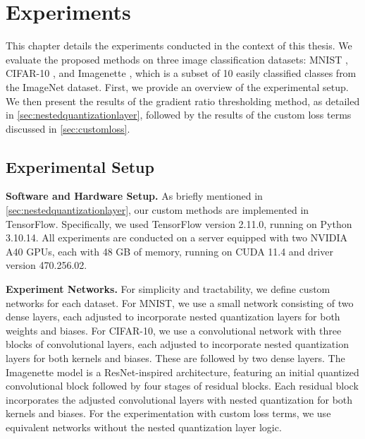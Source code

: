 \chapter{Experiments\label{cha:chapter4}}
\hspace*{1em}This chapter details the experiments conducted in the context of this thesis.
We evaluate the proposed methods on three image classification datasets:
MNIST \cite{lecun2010mnist},
CIFAR-10 \cite{krizhevsky2009learning},
and Imagenette \cite{DBLP:journals/information/HowardG20}, which is a subset of 10 easily classified classes from the ImageNet dataset.
First, we provide an overview of the experimental setup.
We then present the results of the gradient ratio thresholding method, as detailed in \cref{sec:nestedquantizationlayer},
followed by the results of the custom loss terms discussed in \cref{sec:customloss}.


\section{Experimental Setup}
\label{sec:setup}
\hspace*{1em}\textbf{Software and Hardware Setup.} As briefly mentioned in \cref{sec:nestedquantizationlayer},
our custom methods are implemented in TensorFlow.
Specifically, we used TensorFlow version 2.11.0, running on Python 3.10.14. 
All experiments are conducted on a server equipped with two NVIDIA A40 GPUs, 
each with 48 GB of memory, running on CUDA 11.4 and driver version 470.256.02.

\textbf{Experiment Networks.} 
For simplicity and tractability, we define custom networks for each dataset.
For MNIST, we use a small network consisting of two dense layers, 
each adjusted to incorporate nested quantization layers for both weights and biases. 
For CIFAR-10, we use a convolutional network with three blocks of convolutional layers, 
each adjusted to incorporate nested quantization layers for both kernels and biases.
These are followed by two dense layers.
The Imagenette model is a ResNet-inspired architecture,
featuring an initial quantized convolutional block followed by four stages of residual blocks. 
Each residual block incorporates the adjusted convolutional layers with nested quantization 
for both kernels and biases. For the experimentation with custom loss terms, 
we use equivalent networks without the nested quantization layer logic.

